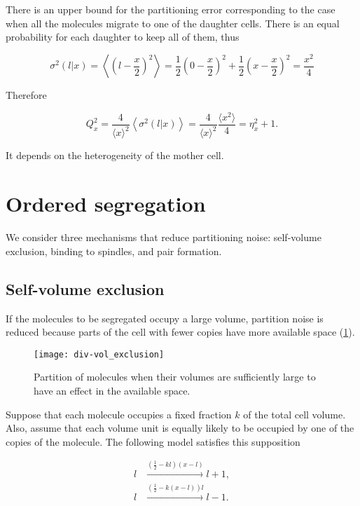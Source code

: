 There is an upper bound for the partitioning error corresponding to the case when all the molecules migrate to one of the daughter cells. There is an equal probability for each daughter to keep all of them, thus

\begin{equation*}
  \sigma^2(l|x) = \left\langle\left(l-\frac{x}{2}\right)^2\right\rangle = \frac{1}{2}\left(0-\frac{x}{2}\right)^2+\frac{1}{2}\left(x-\frac{x}{2}\right)^2 = \frac{x^2}{4}
\end{equation*}

Therefore

\begin{equation*}
  Q_x^2 = \frac{4}{\langle x\rangle^2}\left\langle\sigma^2(l|x)\right\rangle = \frac{4}{\langle x\rangle^2}\frac{\langle x^2\rangle}{4} = \eta_x^2+1.
\end{equation*}

It depends on the heterogeneity of the mother cell.

\section{Ordered segregation}

We consider three mechanisms that reduce partitioning noise: self-volume exclusion, binding to spindles, and pair formation.

\subsection{Self-volume exclusion}

If the molecules to be segregated occupy a large volume, partition noise is reduced because parts of the cell with fewer copies have more available space (\ref{fig:div-vol_exclusion}).

\begin{figure}[H]
  \centering
  \texttt{[image: div-vol\_exclusion]}
  \caption[Partition with size exclusion]{\label{fig:div-vol_exclusion} Partition of molecules when their volumes are sufficiently large to have an effect in the available space.}
\end{figure}

Suppose that each molecule occupies a fixed fraction $k$ of the total cell volume. Also, assume that each volume unit is equally likely to be occupied by one of the copies of the molecule. The following model satisfies this supposition

\begin{equation*}
  \begin{split}
  l&\xrightarrow{(\frac{1}{2}-kl)(x-l)}l+1,\\
  l&\xrightarrow{(\frac{1}{2}-k(x-l))l}l-1.
  \end{split}
\end{equation*}

